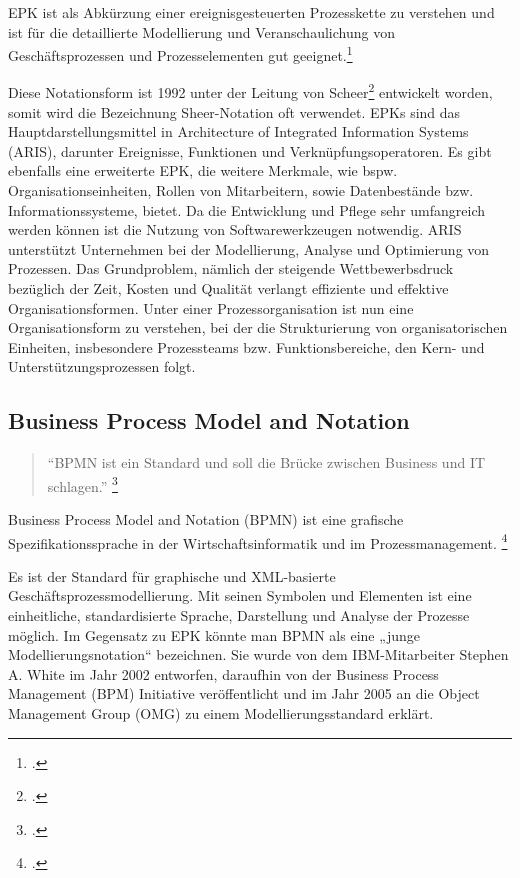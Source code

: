 EPK ist als Abkürzung einer ereignisgesteuerten Prozesskette zu verstehen und
ist für die detaillierte Modellierung und Veranschaulichung
von Geschäftsprozessen und Prozesselementen gut
geeignet.\footcite[Vgl.][]{lehmann}


Diese Notationsform ist 1992 unter der Leitung von
Scheer\footcite[Vgl.][]{scheer} entwickelt worden, somit wird die Bezeichnung
Sheer-Notation oft verwendet.
EPKs sind das Hauptdarstellungsmittel in Architecture of Integrated
Information Systems (ARIS), darunter Ereignisse,
Funktionen und Verknüpfungsoperatoren. Es gibt ebenfalls eine erweiterte EPK,
die weitere Merkmale, wie bspw. Organisationseinheiten, Rollen von Mitarbeitern,
sowie Datenbestände bzw. Informationssysteme, bietet.
Da die Entwicklung und Pflege sehr umfangreich werden können ist die
Nutzung von Softwarewerkzeugen notwendig.
ARIS unterstützt Unternehmen bei der Modellierung, Analyse und Optimierung von Prozessen.
Das Grundproblem, nämlich der steigende Wettbewerbsdruck bezüglich der Zeit,
Kosten und Qualität verlangt effiziente und effektive Organisationsformen.
Unter einer Prozessorganisation ist nun eine Organisationsform zu verstehen,
bei der die Strukturierung von organisatorischen Einheiten,
insbesondere  Prozessteams bzw. Funktionsbereiche,
den Kern- und Unterstützungsprozessen folgt.

\subsection{Business Process Model and Notation}

\begin{quote}
"`BPMN ist ein Standard und soll die Brücke zwischen Business und IT schlagen."'
\footcite[Vgl.][]{praxishandbuch:bpmn2}
\end{quote}

Business Process Model and Notation (BPMN) ist eine grafische
Spezifikationssprache in der Wirtschaftsinformatik und im Prozessmanagement.
\footcite[Vgl.][]{allweyer}

Es ist der Standard für graphische und XML-basierte
Geschäftsprozessmodellierung.
Mit seinen Symbolen und Elementen ist eine einheitliche, standardisierte Sprache,
Darstellung und Analyse der Prozesse möglich.
Im Gegensatz zu EPK könnte man BPMN als eine „junge Modellierungsnotation“ bezeichnen.
Sie wurde von dem IBM-Mitarbeiter Stephen A. White im Jahr 2002 entworfen,
daraufhin von der Business Process Management (BPM)
Initiative veröffentlicht und im Jahr 2005 an die Object Management Group (OMG)
zu einem Modellierungsstandard erklärt.

